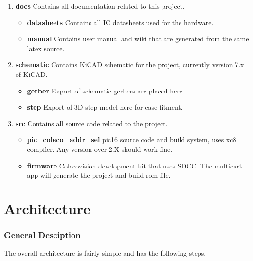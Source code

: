 \documentclass{article}
\begin{document}
  \begin{enumerate}
    \item \textbf{docs} Contains all documentation related to this project.
      \begin{itemize}
        \item \textbf{datasheets} Contains all IC datasheets used for the hardware.
        \item \textbf{manual} Contains user manual and wiki that are generated from the same latex source.
      \end{itemize}
    \item \textbf{schematic} Contains KiCAD schematic for the project, currently version 7.x of KiCAD.
      \begin{itemize}
        \item \textbf{gerber} Export of schematic gerbers are placed here.
        \item \textbf{step} Export of 3D step model here for case fitment.
      \end{itemize}
    \item \textbf{src} Contains all source code related to the project.
      \begin{itemize}
        \item \textbf{pic\_coleco\_addr\_sel} pic16 source code and build system, uses xc8 compiler. Any version over 2.X should work fine.
        \item \textbf{firmware} Colecovision development kit that uses SDCC. The multicart app will generate the project and build rom file.
      \end{itemize}
  \end{enumerate}

  \newpage

  \section{Architecture}
  \subsubsection{General Desciption}

  \par
  The overall architecture is fairly simple and has the following steps.
\end{document}
